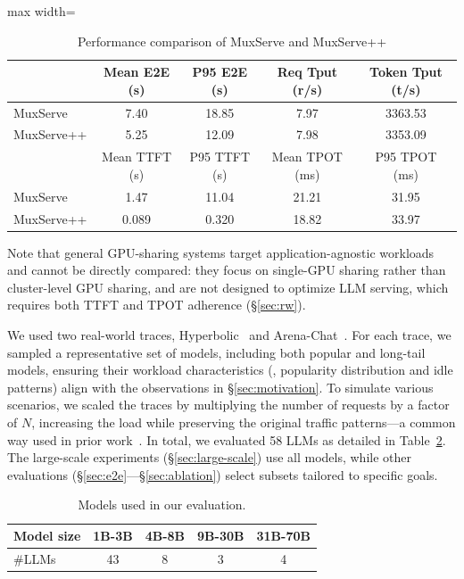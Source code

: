 \begin{table}[t]
\centering
\begin{adjustbox}{max width=\linewidth}
\begin{tabular}{lcccc}
\toprule
 & Mean E2E (s) & P95 E2E (s) & Req Tput (r/s) & Token Tput (t/s) \\
\midrule
MuxServe    & 7.40 & 18.85 & 7.97 & 3363.53 \\
MuxServe++  & 5.25 & 12.09 & 7.98 & 3353.09 \\
\midrule
 & Mean TTFT (s) & P95 TTFT (s) & Mean TPOT (ms) & P95 TPOT (ms) \\
MuxServe    & 1.47 & 11.04 & 21.21 & 31.95 \\
MuxServe++  & 0.089 & 0.320 & 18.82 & 33.97 \\
\bottomrule
\end{tabular}
\end{adjustbox}
\caption{Performance comparison of MuxServe and MuxServe++}
\label{tab:muxserve-comparison-slim}
\end{table}

Note that general GPU-sharing systems target application-agnostic workloads and cannot be directly compared: they focus on single-GPU sharing rather than cluster-level GPU sharing, and are not designed to optimize LLM serving, which requires both TTFT and TPOT adherence (\S\ref{sec:rw}).

We used two real-world traces, Hyperbolic~\cite{hyperbolic} and Arena-Chat~\cite{chatbotarena@arxiv24}. For each trace, we sampled a representative set of models, including both popular and long-tail models, ensuring their workload characteristics (\eg, popularity distribution and idle patterns) align with the observations in \S\ref{sec:motivation}.
To simulate various scenarios, we scaled the traces by multiplying the number of requests by a factor of $N$, increasing the load while preserving the original traffic patterns---a common way used in prior work~\cite{alpaserve@osdi23, muxserve}.
In total, we evaluated 58 LLMs as detailed in Table~\ref{tab:models}. The large-scale experiments (\S\ref{sec:large-scale}) use all models, while other evaluations (\S\ref{sec:e2e}---\S\ref{sec:ablation}) select subsets tailored to specific goals.

\begin{table}[t]
\centering
\footnotesize
\begin{tabular}{lcccc}
\toprule
\textbf{Model size} & 1B-3B & 4B-8B & 9B-30B & 31B-70B \\
\midrule
\#LLMs & 43 & 8 & 3 & 4 \\
\bottomrule
\end{tabular}
\vspace{-2mm}
\caption{Models used in our evaluation.}
\vspace{-1mm}
\label{tab:models}
\end{table}

